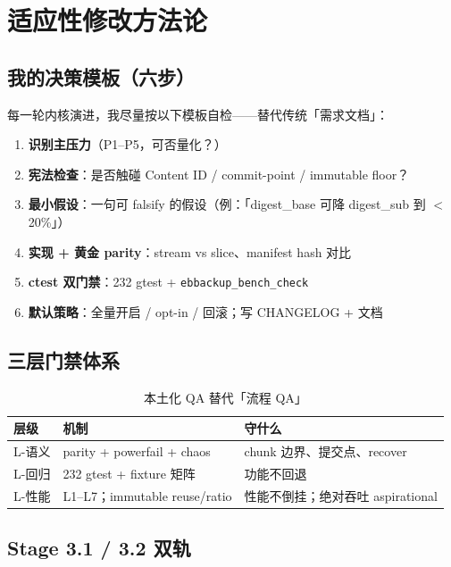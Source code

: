 \chapter{适应性修改方法论}
\label{ch:methodology}

\section{我的决策模板（六步）}

每一轮内核演进，我尽量按以下模板自检——替代传统「需求文档」：

\begin{enumerate}
  \item \textbf{识别主压力}（P1--P5，可否量化？）
  \item \textbf{宪法检查}：是否触碰 Content ID / commit-point / immutable floor？
  \item \textbf{最小假设}：一句可 falsify 的假设（例：「digest\_base 可降 digest\_sub 到 $<$20\%」）
  \item \textbf{实现 + 黄金 parity}：stream vs slice、manifest hash 对比
  \item \textbf{ctest 双门禁}：232 gtest + \texttt{ebbackup\_bench\_check}
  \item \textbf{默认策略}：全量开启 / opt-in / 回滚；写 CHANGELOG + 文档
\end{enumerate}

\section{三层门禁体系}

\begin{table}[htbp]
\centering
\caption{本土化 QA 替代「流程 QA」}
\begin{tabular}{@{}llp{6.5cm}@{}}
\toprule
层级 & 机制 & 守什么 \\
\midrule
L-语义 & parity + powerfail + chaos & chunk 边界、提交点、recover \\
L-回归 & 232 gtest + fixture 矩阵 & 功能不回退 \\
L-性能 & L1--L7；immutable reuse/ratio & 性能不倒挂；绝对吞吐 aspirational \\
\bottomrule
\end{tabular}
\end{table}

\section{Stage 3.1 / 3.2 双轨}

